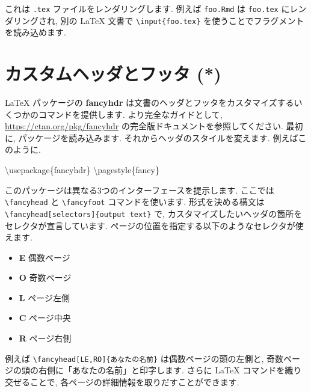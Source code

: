 \documentclass[
  11pt,
  lualatex,
  ja=standard]{bxjsreport}
\newenvironment{Shaded}{\begin{snugshade}}{\end{snugshade}}
\newcommand{\BuiltInTok}[1]{#1}
\newcommand{\ExtensionTok}[1]{#1}
\newcommand{\FunctionTok}[1]{\textcolor[rgb]{0.00,0.00,0.00}{#1}}
\newcommand{\NormalTok}[1]{#1}
\providecommand{\tightlist}{%
  \setlength{\itemsep}{0pt}\setlength{\parskip}{0pt}}
\begin{document}
これは \texttt{.tex} ファイルをレンダリングします. 例えば \texttt{foo.Rmd} は \texttt{foo.tex} にレンダリングされ, 別の LaTeX 文書で \texttt{\textbackslash{}input\{foo.tex\}} を使うことでフラグメントを読み込めます.

\hypertarget{latex-header}{%
\section{カスタムヘッダとフッタ (*)}\label{latex-header}}

LaTeX パッケージの \textbf{fancyhdr} は文書のヘッダとフッタをカスタマイズするいくつかのコマンドを提供します. より完全なガイドとして, \url{https://ctan.org/pkg/fancyhdr} の完全版ドキュメントを参照してください. 最初に, パッケージを読み込みます. それからヘッダのスタイルを変えます. 例えばこのように.

\begin{Shaded}
\begin{Highlighting}[]
\BuiltInTok{\textbackslash{}usepackage}\NormalTok{\{}\ExtensionTok{fancyhdr}\NormalTok{\}}
\FunctionTok{\textbackslash{}pagestyle}\NormalTok{\{fancy\}}
\end{Highlighting}
\end{Shaded}

このパッケージは異なる3つのインターフェースを提示します. ここでは \texttt{\textbackslash{}fancyhead} と \texttt{\textbackslash{}fancyfoot} コマンドを使います. 形式を決める構文は \texttt{\textbackslash{}fancyhead{[}selectors{]}\{output\ text\}} で, カスタマイズしたいヘッダの箇所をセレクタが宣言しています. ページの位置を指定する以下のようなセレクタが使えます.

\begin{itemize}
\tightlist
\item
  \textbf{E} 偶数ページ
\item
  \textbf{O} 奇数ページ
\item
  \textbf{L} ページ左側
\item
  \textbf{C} ページ中央
\item
  \textbf{R} ページ右側
\end{itemize}

例えば \texttt{\textbackslash{}fancyhead{[}LE,RO{]}\{あなたの名前\}} は偶数ページの頭の左側と, 奇数ページの頭の右側に「あなたの名前」と印字します. さらに LaTeX コマンドを織り交ぜることで, 各ページの詳細情報を取りだすことができます.
\end{document}
